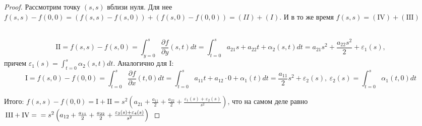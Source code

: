 \begin{theorem}
\begin{proof}
        \newpage
        \begin{minipage}[t]{0.45\textwidth}        
        \end{minipage}
        \begin{minipage}[t]{0.5\textwidth}
            Рассмотрим точку $(s,s)$ вблизи нуля. Для нее 
            $f(s,s) - f(0,0) = (f(s,s) - f(s, 0)) + (f(s,0) - f(0,0)) = (II) + (I)$. \newline
            И в то же время $f(s, s) =  (\text{IV}) + (\text{III})$
        \end{minipage}
        \\[100pt]
        \[\text{II} = f(s,s) - f(s,0) = \int_{y=0}^{s}\frac{\partial f}{\partial y}(s,t)dt
        = \int_{t=0}^{s}a_{21}s + a_{22}t + \alpha_2(s,t)dt = a_{21}s^2 + \frac{a_{22}s^2}{2} + \varepsilon_1(s),\]
        причем $\varepsilon_1(s) = \int_{t=0}^{s}\alpha_2(s,t)dt$. Аналогично для I:
        \[\text{I} = f(s,0) - f(0,0) = \int_{t=0}^{s}\frac{\partial f}{\partial x}(t,0)dt = \int_{t=0}^{s}a_{11}t+a_{12}\cdot0 + \alpha_1(t)dt = 
        \frac{a_{11}}{2}s^2 + \varepsilon_2(s), \ \varepsilon_2(s) = \int_{t=0}^{s}\alpha_1(t,0)dt\]
        
        Итого: $f(s,s) - f(0,0) = \text{I} + \text{II} = s^2 \left( a_{21} + \frac{a_{11}}{2} + \frac{a_{22}}{2}+ \frac{\varepsilon_1(s) + \varepsilon_2(s)}{s^2}\right)$, что на самом деле равно $\text{III} + \text{IV} = 
        \\ = s^2\left(a_{12} + \frac{a_{11}}{2} + \frac{a_{22}}{2} + \frac{\varepsilon_3(s) + \varepsilon_4(s)}{s^2}\right)$
        
    
    \end{proof}
\end{theorem}
